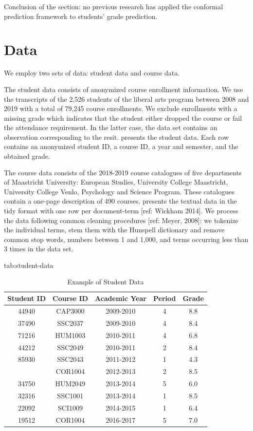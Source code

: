 \documentclass[pmlr]{jmlr}%
\begin{document}
Conclusion of the section: no previous research has applied the conformal prediction framework to students' grade prediction.

\section{Data}
\label{sec:data}

We employ two sets of data: student data and course data.

The student data consists of anonymized course enrollment information. We use the transcripts of the 2,526 students of the liberal arts program between 2008 and 2019 with a total of 79,245 course enrollments. We exclude enrollments with a missing grade which indicates that the student either dropped the course or fail the attendance requirement. In the latter case, the data set contains an observation corresponding to the resit.  presents the student data. Each row contains an anonymized student ID, a course ID, a year and semester, and the obtained grade.

The course data consists of the 2018-2019 course catalogues of five departments of Maastricht University: European Studies, University College Maastricht, University College Venlo, Psychology and Science Program. These catalogues contain a one-page description of 490 courses.  presents the textual data in the tidy format with one row per document-term [ref: Wickham 2014]. We process the data following common cleaning procedures [ref: Meyer, 2008]: we tokenize the individual terms, stem them with the Hunspell dictionary and remove common stop words, numbers between 1 and 1,000, and terms occurring less than 3 times in the data set.

\begin{table}[hbtp]
	\floatconts
	{tab:student-data}
	{\caption{Example of Student Data}}	
	{\begin{tabular}{ccccc}
		\toprule
		\bfseries Student ID &\bfseries Course ID &\bfseries Academic Year &\bfseries Period &\bfseries Grade\\
		\midrule
		44940 & CAP3000 & 2009-2010 & 4 & 8.8\\
		37490 & SSC2037 & 2009-2010 & 4 & 8.4\\
		71216 & HUM1003 & 2010-2011 & 4 & 6.8\\
		44212 & SSC2049 & 2010-2011 & 2 & 8.4\\
		85930 & SSC2043 & 2011-2012 & 1 & 4.3\\
		\addlinespace
		14492 & COR1004 & 2012-2013 & 2 & 8.5\\
		34750 & HUM2049 & 2013-2014 & 5 & 6.0\\
		32316 & SSC1001 & 2013-2014 & 1 & 8.5\\
		22092 & SCI1009 & 2014-2015 & 1 & 6.4\\
		19512 & COR1004 & 2016-2017 & 5 & 7.0\\
		\bottomrule
	\end{tabular}}	
\end{table}
\end{document}
